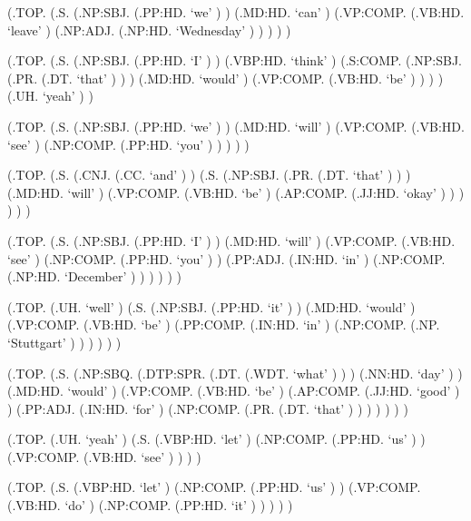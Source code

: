 \documentclass[10pt]{article}
\begin{document}
\begin{parsetree}  (.TOP. (.S. (.NP:SBJ. (.PP:HD. `we' ) ) (.MD:HD. `can' ) (.VP:COMP. (.VB:HD. `leave' ) (.NP:ADJ. (.NP:HD. `Wednesday' ) ) ) ) ) \end{parsetree}

\begin{parsetree}  (.TOP. (.S. (.NP:SBJ. (.PP:HD. `I' ) ) (.VBP:HD. `think' ) (.S:COMP. (.NP:SBJ. (.PR. (.DT. `that' ) ) ) (.MD:HD. `would' ) (.VP:COMP. (.VB:HD. `be' ) ) ) ) (.UH. `yeah' ) ) \end{parsetree}

\begin{parsetree}  (.TOP. (.S. (.NP:SBJ. (.PP:HD. `we' ) ) (.MD:HD. `will' ) (.VP:COMP. (.VB:HD. `see' ) (.NP:COMP. (.PP:HD. `you' ) ) ) ) ) \end{parsetree}

\begin{parsetree}  (.TOP. (.S. (.CNJ. (.CC. `and' ) ) (.S. (.NP:SBJ. (.PR. (.DT. `that' ) ) ) (.MD:HD. `will' ) (.VP:COMP. (.VB:HD. `be' ) (.AP:COMP. (.JJ:HD. `okay' ) ) ) ) ) ) \end{parsetree}

\begin{parsetree}  (.TOP. (.S. (.NP:SBJ. (.PP:HD. `I' ) ) (.MD:HD. `will' ) (.VP:COMP. (.VB:HD. `see' ) (.NP:COMP. (.PP:HD. `you' ) ) (.PP:ADJ. (.IN:HD. `in' ) (.NP:COMP. (.NP:HD. `December' ) ) ) ) ) ) \end{parsetree}

\begin{parsetree}  (.TOP. (.UH. `well' ) (.S. (.NP:SBJ. (.PP:HD. `it' ) ) (.MD:HD. `would' ) (.VP:COMP. (.VB:HD. `be' ) (.PP:COMP. (.IN:HD. `in' ) (.NP:COMP. (.NP. `Stuttgart' ) ) ) ) ) ) \end{parsetree}

\begin{parsetree}  (.TOP. (.S. (.NP:SBQ. (.DTP:SPR. (.DT. (.WDT. `what' ) ) ) (.NN:HD. `day' ) ) (.MD:HD. `would' ) (.VP:COMP. (.VB:HD. `be' ) (.AP:COMP. (.JJ:HD. `good' ) ) (.PP:ADJ. (.IN:HD. `for' ) (.NP:COMP. (.PR. (.DT. `that' ) ) ) ) ) ) ) \end{parsetree}

\begin{parsetree}  (.TOP. (.UH. `yeah' ) (.S. (.VBP:HD. `let' ) (.NP:COMP. (.PP:HD. `us' ) ) (.VP:COMP. (.VB:HD. `see' ) ) ) ) \end{parsetree}

\begin{parsetree}  (.TOP. (.S. (.VBP:HD. `let' ) (.NP:COMP. (.PP:HD. `us' ) ) (.VP:COMP. (.VB:HD. `do' ) (.NP:COMP. (.PP:HD. `it' ) ) ) ) ) \end{parsetree}
\end{document}
